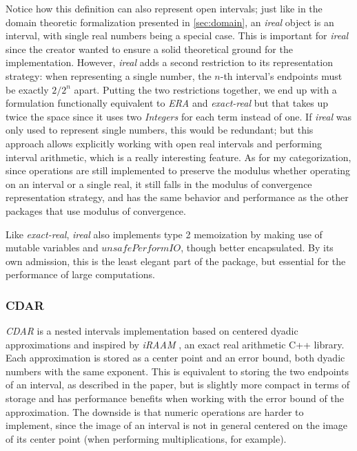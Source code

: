 Notice how this definition can also represent open intervals; just like in the domain theoretic formalization presented in \cref{sec:domain}, an \textit{ireal} object is an interval, with single real numbers being a special case. This is important for \textit{ireal} since the creator wanted to ensure a solid theoretical ground for the implementation. However, \textit{ireal} adds a second restriction to its representation strategy: when representing a single number, the $n$-th interval's endpoints must be exactly $2/2^n$ apart. Putting the two restrictions together, we end up with a formulation functionally equivalent to \textit{ERA} and \textit{exact-real} but that takes up twice the space since it uses two \textit{Integers} for each term instead of one. If \textit{ireal} was only used to represent single numbers, this would be redundant; but this approach allows explicitly working with open real intervals and performing interval arithmetic, which is a really interesting feature. As for my categorization, since operations are still implemented to preserve the modulus whether operating on an interval or a single real, it still falls in the modulus of convergence representation strategy, and has the same behavior and performance as the other packages that use modulus of convergence.

Like \textit{exact-real}, \textit{ireal} also implements type 2 memoization by making use of mutable variables and $unsafePerformIO$, though better encapsulated. By its own admission, this is the least elegant part of the package, but essential for the performance of large computations.

\subsubsection{CDAR}

\textit{CDAR} \cite{BLANCK200650,CDAR} is a nested intervals implementation based on centered dyadic approximations and inspired by \textit{iRAAM} \cite{iRRAM}, an exact real arithmetic C++ library. Each approximation is stored as a center point and an error bound, both dyadic numbers with the same exponent. This is equivalent to storing the two endpoints of an interval, as described in the paper, but is slightly more compact in terms of storage and has performance benefits when working with the error bound of the approximation. The downside is that numeric operations are harder to implement, since the image of an interval is not in general centered on the image of its center point (when performing multiplications, for example).

